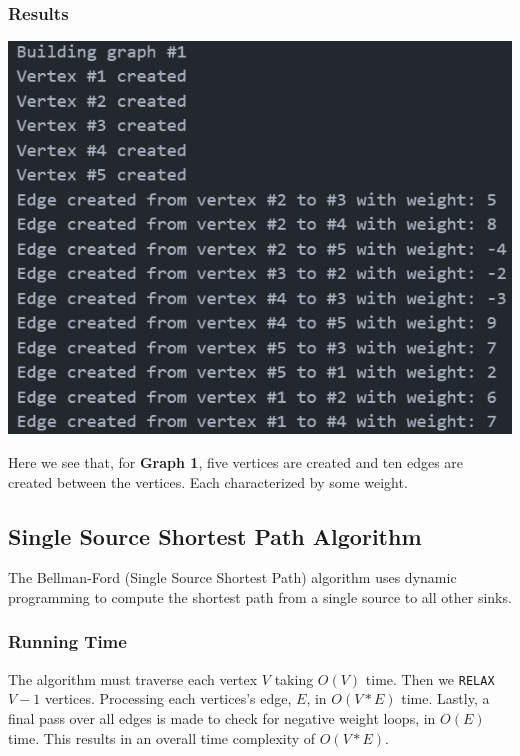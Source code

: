 \documentclass[12pt, letterpaper]{article}
\begin{document}
\subsubsection{Results}
\begin{center}
   \includegraphics{images/Graph1_ParseBuild.png}
\end{center}
Here we see that, for \textbf{Graph 1}, five vertices are created and ten edges are created between the vertices.
Each characterized by some weight.

\subsection{Single Source Shortest Path Algorithm} \label{Graph_SSSP}
The Bellman-Ford (Single Source Shortest Path) algorithm uses dynamic programming to compute the shortest path from a single source to all other sinks.

\subsubsection{Running Time}
The algorithm must traverse each vertex $V$ taking $O(V)$ time.
Then we \texttt{RELAX} $V-1$ vertices.
Processing each vertices's edge, $E$, in $O(V*E)$ time.
Lastly, a final pass over all edges is made to check for negative weight loops, in $O(E)$ time.
This results in an overall time complexity of $O(V*E)$.
\end{document}
